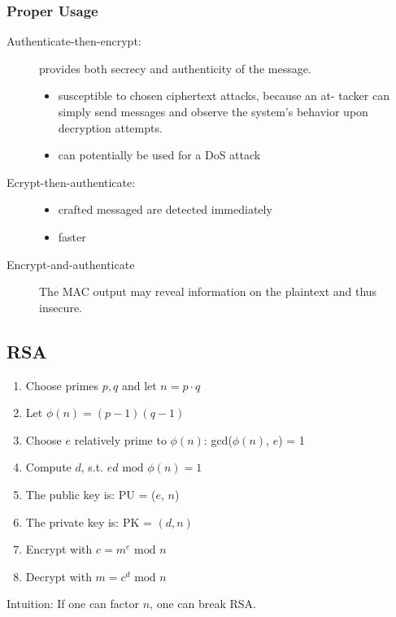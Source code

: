 \subsubsection{Proper Usage}
\begin{description}
  \item[Authenticate-then-encrypt:] provides both secrecy and authenticity of the message.
    \begin{itemize}
      \item susceptible to chosen ciphertext attacks, because an at-
	tacker can simply send messages and observe the system’s behavior upon
	decryption attempts.
      \item can potentially be used for a DoS attack
    \end{itemize}
  \item[Ecrypt-then-authenticate:]
    \begin{itemize}
      \item crafted messaged are detected immediately
      \item faster
    \end{itemize}
  \item[Encrypt-and-authenticate]
    The MAC output may reveal information on the plaintext and thus insecure.
\end{description}
\subsection{RSA}
\begin{enumerate}
  \item Choose primes $p,q$ and let $n = p\cdot q$
  \item Let  $\phi(n) = (p-1)(q-1)$
  \item Choose $e$ relatively prime to  $\phi(n)$: gcd($\phi(n)$, $e$) = 1
  \item Compute $d$, s.t. $ed \text{ mod } \phi(n) = 1$
  \item The public key is: PU = ($e$, $n$)
  \item The private key is: PK =  $(d, n)$
  \item Encrypt with $c = m^e \text{ mod } n $
  \item Decrypt with $m = c^d \text{ mod } n$
\end{enumerate}
Intuition: If one can factor $n$, one can break RSA.
